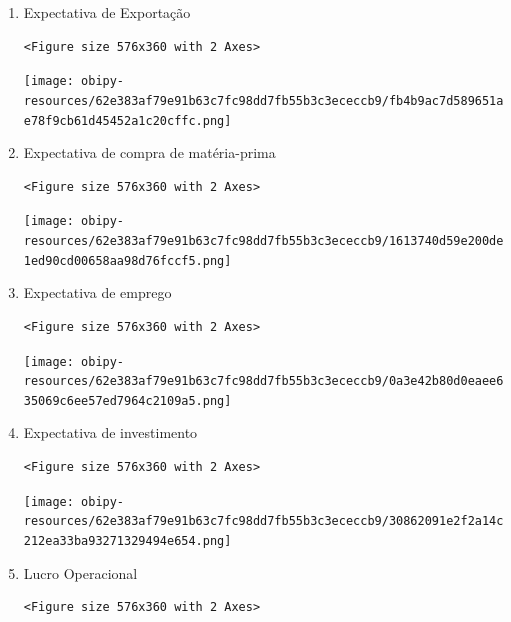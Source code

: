 \documentclass[11pt]{article}
\begin{document}
\begin{enumerate}
\item Expectativa de Exportação
\label{sec:org16ae293}

\begin{verbatim}
<Figure size 576x360 with 2 Axes>
\end{verbatim}


\begin{center}
\texttt{[image: obipy-resources/62e383af79e91b63c7fc98dd7fb55b3c3ececcb9/fb4b9ac7d589651ae78f9cb61d45452a1c20cffc.png]}
\end{center}

\item Expectativa de compra de matéria-prima
\label{sec:org9aebe25}


\begin{verbatim}
<Figure size 576x360 with 2 Axes>
\end{verbatim}


\begin{center}
\texttt{[image: obipy-resources/62e383af79e91b63c7fc98dd7fb55b3c3ececcb9/1613740d59e200de1ed90cd00658aa98d76fccf5.png]}
\end{center}

\item Expectativa de emprego
\label{sec:org8c265f6}

\begin{verbatim}
<Figure size 576x360 with 2 Axes>
\end{verbatim}


\begin{center}
\texttt{[image: obipy-resources/62e383af79e91b63c7fc98dd7fb55b3c3ececcb9/0a3e42b80d0eaee635069c6ee57ed7964c2109a5.png]}
\end{center}

\item Expectativa de investimento
\label{sec:org75cdb42}

\begin{verbatim}
<Figure size 576x360 with 2 Axes>
\end{verbatim}


\begin{center}
\texttt{[image: obipy-resources/62e383af79e91b63c7fc98dd7fb55b3c3ececcb9/30862091e2f2a14c212ea33ba93271329494e654.png]}
\end{center}

\item Lucro Operacional
\label{sec:orga3a2b9c}


\begin{verbatim}
<Figure size 576x360 with 2 Axes>
\end{verbatim}



\end{enumerate}
\end{document}
